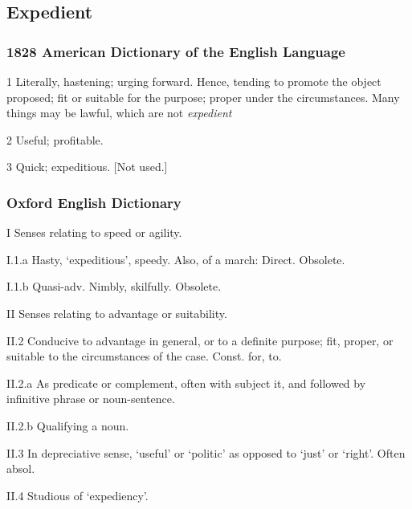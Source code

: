 	\subsection{Expedient} %
		\label{EXPEDIENT}
		
		\subsubsection{1828 American Dictionary of the English Language}
		
			\begin{compactitem}
				\item[1] Literally, hastening; urging forward. Hence, tending to promote the object proposed; fit or suitable for the purpose; proper under the circumstances. Many things may be lawful, which are not \textit{expedient}
				\item[2] Useful; profitable.
				\item[3] Quick; expeditious. [Not used.]
			\end{compactitem}
			
		\subsubsection{Oxford English Dictionary}

			\begin{compactitem}
				\item[I] Senses relating to speed or agility.
				\item[I.1.a] Hasty, `expeditious', speedy. Also, of a march: Direct. Obsolete.
				\item[I.1.b] Quasi-adv. Nimbly, skilfully. Obsolete.
				\item[II] Senses relating to advantage or suitability.
				\item[II.2] Conducive to advantage in general, or to a definite purpose; fit, proper, or suitable to the circumstances of the case. Const. for, to.
				\item[II.2.a] As predicate or complement, often with subject it, and followed by infinitive phrase or noun-sentence.
				\item[II.2.b] Qualifying a noun.
				\item[II.3] In depreciative sense, `useful' or `politic' as opposed to `just' or `right'. Often absol.
				\item[II.4] Studious of `expediency'.
			\end{compactitem}
			
